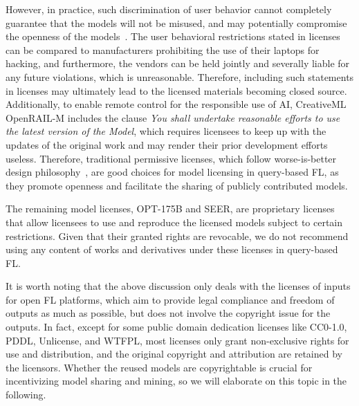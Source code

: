 \documentclass[journal]{IEEEtran}
\begin{document}
  However, in practice, such discrimination of user behavior cannot completely guarantee that the models will not be misused, and may potentially compromise the openness of the models~\cite{perens1999open, greenbaum2016the}.
  The user behavioral restrictions stated in licenses can be compared to manufacturers prohibiting the use of their laptops for hacking, and furthermore, the vendors can be held jointly and severally liable for any future violations, which is unreasonable.
  Therefore, including such statements in licenses may ultimately lead to the licensed materials becoming closed source. 
  Additionally, to enable remote control for the responsible use of AI, CreativeML OpenRAIL-M includes the clause \textit{You shall undertake reasonable efforts to use the latest version of the Model}, which requires licensees to keep up with the updates of the original work and may render their prior development efforts useless.
  Therefore, traditional permissive licenses, which follow worse-is-better design philosophy~\cite{gabriel1991rise}, are good choices for model licensing in query-based FL, as they promote openness and facilitate the sharing of publicly contributed models.

  The remaining model licenses, OPT-175B and SEER, are proprietary licenses that allow licensees to use and reproduce the licensed models subject to certain restrictions. 
  Given that their granted rights are revocable, we do not recommend using any content of works and derivatives under these licenses in query-based FL.

It is worth noting that the above discussion only deals with the licenses of inputs for open FL platforms, which aim to provide legal compliance and freedom of outputs as much as possible, but does not involve the copyright issue for the outputs.
In fact, except for some public domain dedication licenses like CC0-1.0, PDDL, Unlicense, and WTFPL, most licenses only grant non-exclusive rights for use and distribution, and the original copyright and attribution are retained by the licensors.
Whether the reused models are copyrightable is crucial for incentivizing model sharing and mining, so we will elaborate on this topic in the following.
\end{document}
